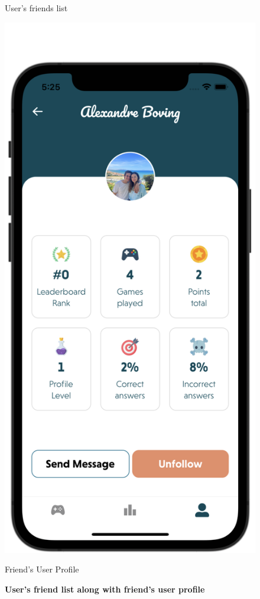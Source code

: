 \begin{figure}[H]
\begin{minipage}[b]{0.43\linewidth}
        \caption{User's friends list}
    \end{minipage}
    \hspace{0.1\linewidth}
    \begin{minipage}[b]{0.43\linewidth}
        \centering
        \includegraphics[width=\linewidth]{Mobile UI/Friend's Profile.png}
        \caption{Friend's User Profile}
    \end{minipage}
    \vspace{0.5cm}
    \caption{\textbf{User's friend list along with friend's user profile}}
\end{figure}

